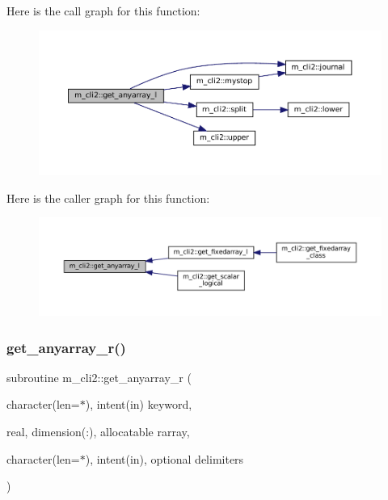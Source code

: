Here is the call graph for this function\+:
\nopagebreak
\begin{figure}[H]
\begin{center}
\leavevmode
\includegraphics[width=350pt]{namespacem__cli2_a47cc758d20b655bc21672c31289e54ce_cgraph}
\end{center}
\end{figure}
Here is the caller graph for this function\+:
\nopagebreak
\begin{figure}[H]
\begin{center}
\leavevmode
\includegraphics[width=350pt]{namespacem__cli2_a47cc758d20b655bc21672c31289e54ce_icgraph}
\end{center}
\end{figure}
\mbox{\label{namespacem__cli2_a8f1d5223b075f23d513c94548a1ebf09}} 
\subsubsection{\texorpdfstring{get\+\_\+anyarray\+\_\+r()}{get\_anyarray\_r()}}
{\footnotesize\ttfamily subroutine m\+\_\+cli2\+::get\+\_\+anyarray\+\_\+r (\begin{DoxyParamCaption}\item[{character(len=$\ast$), intent(in)}]{keyword,  }\item[{real, dimension(\+:), allocatable}]{rarray,  }\item[{character(len=$\ast$), intent(in), optional}]{delimiters }\end{DoxyParamCaption})\hspace{0.3cm}{\ttfamily [private]}}



